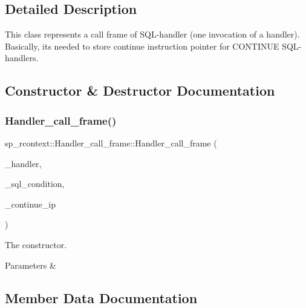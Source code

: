 \subsection{Detailed Description}
This class represents a call frame of S\+QL-\/handler (one invocation of a handler). Basically, it\textquotesingle{}s needed to store continue instruction pointer for C\+O\+N\+T\+I\+N\+UE S\+QL-\/handlers. 

\subsection{Constructor \& Destructor Documentation}
\mbox{\label{classsp__rcontext_1_1Handler__call__frame_a1094f48f9d25990d569a254bfcdf4850}} 
\subsubsection{\texorpdfstring{Handler\+\_\+call\+\_\+frame()}{Handler\_call\_frame()}}
{\footnotesize\ttfamily sp\+\_\+rcontext\+::\+Handler\+\_\+call\+\_\+frame\+::\+Handler\+\_\+call\+\_\+frame (\begin{DoxyParamCaption}\item[{const \mbox{\hyperlink{classsp__handler}{sp\+\_\+handler}} $\ast$}]{\+\_\+handler,  }\item[{\mbox{\hyperlink{classSql__condition}{Sql\+\_\+condition}} $\ast$}]{\+\_\+sql\+\_\+condition,  }\item[{uint}]{\+\_\+continue\+\_\+ip }\end{DoxyParamCaption})\hspace{0.3cm}{\ttfamily [inline]}}

The constructor.


\begin{DoxyParams}{Parameters}
{\em } & \\
\hline
\end{DoxyParams}


\subsection{Member Data Documentation}
\mbox{\label{classsp__rcontext_1_1Handler__call__frame_a47ee7281431a1f92e77bf95156ad38ec}} 
